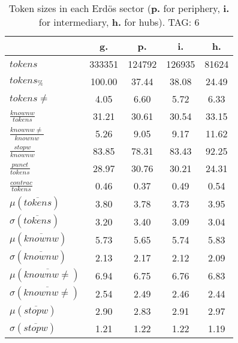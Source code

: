 \begin{table}[h!]
\begin{center}
\begin{tabular}{| l || c | c | c | c |}\hline
 & {\bf g.} & {\bf p.} & {\bf i.} & {\bf h.} \\\hline\hline
$tokens$ & 333351  & 124792  & 126935  & 81624 \\
$tokens_{\%}$ & 100.00  & 37.44  & 38.08  & 24.49 \\
$tokens \neq$ & 4.05  & 6.60  & 5.72  & 6.33 \\\hline
$\frac{knownw}{tokens}$ & 31.21  & 30.61  & 30.54  & 33.15 \\
$\frac{knownw \neq}{knownw}$ & 5.26  & 9.05  & 9.17  & 11.62 \\\hline
$\frac{stopw}{knownw}$ & 83.85  & 78.31  & 83.43  & 92.25 \\
$\frac{punct}{tokens}$ & 28.97  & 30.76  & 30.21  & 24.31 \\
$\frac{contrac}{tokens}$ & 0.46  & 0.37  & 0.49  & 0.54 \\\hline\hline
$\mu(\overline{tokens})$ & 3.80  & 3.78  & 3.73  & 3.95 \\
$\sigma(\overline{tokens})$ & 3.20  & 3.40  & 3.09  & 3.04 \\\hline
$\mu(\overline{knownw})$ & 5.73  & 5.65  & 5.74  & 5.83 \\
$\sigma(\overline{knownw})$ & 2.13  & 2.17  & 2.12  & 2.09 \\\hline
$\mu(\overline{knownw \neq})$ & 6.94  & 6.75  & 6.76  & 6.83 \\
$\sigma(\overline{knownw \neq})$ & 2.54  & 2.49  & 2.46  & 2.44 \\\hline
$\mu(\overline{stopw})$ & 2.90  & 2.83  & 2.91  & 2.97 \\
$\sigma(\overline{stopw})$ & 1.21  & 1.22  & 1.22  & 1.19 \\\hline
\end{tabular}
\caption{Token sizes in each Erd\"os sector ({{\bf p.}} for periphery, {{\bf i.}} for intermediary, {{\bf h.}} for hubs). TAG: 6}
\end{center}
\end{table}